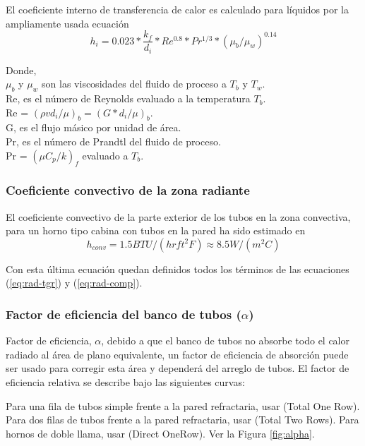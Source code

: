 \par El coeficiente interno de transferencia de calor es calculado para líquidos por la ampliamente usada ecuación
\begin{equation}
\label{eq:hi}
 h_i = 0.023 * \frac{k_f}{d_i} *Re^{0.8} *Pr^{1/3} *(\mu_b /\mu_w )^{0.14}
\end{equation}
\par Donde,\\
$\mu_b$ y $\mu_w$ son las viscosidades del fluido de proceso a $T_b$ y $T_w$. \\
Re, es el número de Reynolds evaluado a la temperatura $T_b$. \\
Re = $(\rho v d_i / \mu)_b = (G *d_i / \mu)_b$. \\
G, es el flujo másico por unidad de área. \\
Pr, es el número de Prandtl del fluido de proceso. \\
Pr = $(\mu C_p / k)_f$ evaluado a $T_b$.

\subsubsection{Coeficiente convectivo de la zona radiante}
\par El coeficiente convectivo de la parte exterior de los tubos en la zona convectiva, para un horno tipo cabina con tubos en la pared ha sido estimado en
\begin{equation}
h_{conv} = 1.5  BTU/(hr ft^2 F) \approx 8.5 W/(m^2 C)
\end{equation}
\par Con esta última ecuación quedan definidos todos los términos de las ecuaciones (\ref{eq:rad-tgr}) y (\ref{eq:rad-comp}).

\subsubsection{Factor de eficiencia del banco de tubos ($\alpha$)}
\par Factor de eficiencia, $\alpha$, debido a que el banco de tubos no absorbe todo el calor radiado al área de plano equivalente, un factor de eficiencia de absorción puede ser usado para corregir esta área y dependerá del arreglo de tubos. El factor de eficiencia relativa se describe bajo las siguientes curvas:
\par Para una fila de tubos simple frente a la pared refractaria, usar (Total One Row). Para dos filas de tubos frente a la pared refractaria, usar (Total Two Rows). Para hornos de doble llama, usar (Direct OneRow). Ver la Figura \ref{fig:alpha}.

